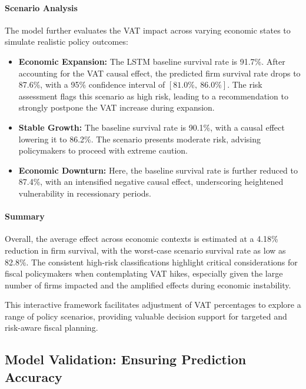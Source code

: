 \paragraph{Scenario Analysis}
The model further evaluates the VAT impact across varying economic states to simulate realistic policy outcomes:

\begin{itemize}
    \item \textbf{Economic Expansion:} The LSTM baseline survival rate is 91.7\%. After accounting for the VAT causal effect, the predicted firm survival rate drops to 87.6\%, with a 95\% confidence interval of $[81.0\%,\ 86.0\%]$. The risk assessment flags this scenario as high risk, leading to a recommendation to strongly postpone the VAT increase during expansion.
    \item \textbf{Stable Growth:} The baseline survival rate is 90.1\%, with a causal effect lowering it to 86.2\%. The scenario presents moderate risk, advising policymakers to proceed with extreme caution.
    \item \textbf{Economic Downturn:} Here, the baseline survival rate is further reduced to 87.4\%, with an intensified negative causal effect, underscoring heightened vulnerability in recessionary periods.
\end{itemize}

\paragraph{Summary}
Overall, the average effect across economic contexts is estimated at a 4.18\% reduction in firm survival, with the worst-case scenario survival rate as low as 82.8\%. The consistent high-risk classifications highlight critical considerations for fiscal policymakers when contemplating VAT hikes, especially given the large number of firms impacted and the amplified effects during economic instability.

This interactive framework facilitates adjustment of VAT percentages to explore a range of policy scenarios, providing valuable decision support for targeted and risk-aware fiscal planning.

\subsection{Model Validation: Ensuring Prediction Accuracy}

